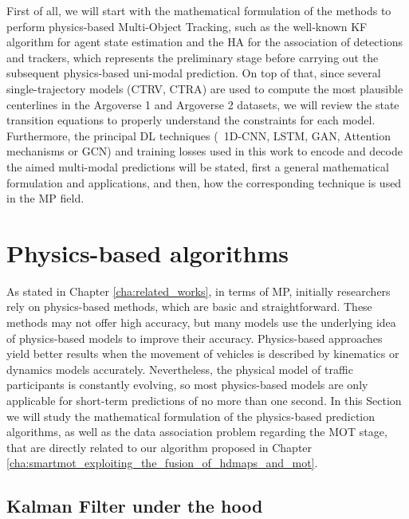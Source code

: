 First of all, we will start with the mathematical formulation of the methods to perform physics-based Multi-Object Tracking, such as the well-known \acf{KF} algorithm \cite{kalman1960new} for agent state estimation and the \ac{HA} \cite{kuhn1955hungarian} for the association of detections and trackers, which represents the preliminary stage before carrying out the subsequent physics-based uni-modal prediction. On top of that, since several single-trajectory models (\ac{CTRV}, \ac{CTRA}) are used to compute the most plausible centerlines in the Argoverse 1 \cite{chang2019argoverse} and Argoverse 2 \cite{wilson2023argoverse} datasets, we will review the state transition equations to properly understand the constraints for each model. Furthermore, the principal \ac{DL} techniques (\eg \ 1D-\ac{CNN}, \ac{LSTM}, \ac{GAN}, Attention mechanisms or \ac{GCN}) and training losses used in this work to encode and decode the aimed multi-modal predictions will be stated, first a general mathematical formulation and applications, and then, how the corresponding technique is used in the \ac{MP} field.

\section{Physics-based algorithms}
\label{sec:3_pb_formulation}


As stated in Chapter \ref{cha:related_works}, in terms of \ac{MP}, initially researchers rely on physics-based methods, which are basic and straightforward. These methods may not offer high accuracy, but many models use the underlying idea of physics-based models to improve their accuracy. Physics-based approaches yield better results when the movement of vehicles is described by kinematics or dynamics models accurately. Nevertheless, the physical model of traffic participants is constantly evolving, so most physics-based models are only applicable for short-term predictions of no more than one second. In this Section we will study the mathematical formulation of the physics-based prediction algorithms, as well as the data association problem regarding the \acf{MOT} stage, that are directly related to our algorithm proposed in Chapter \ref{cha:smartmot_exploiting_the_fusion_of_hdmaps_and_mot}.

\subsection{Kalman Filter under the hood}
\label{subsec:3_kf_formulation}

